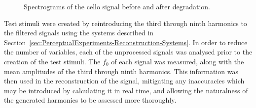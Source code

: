 			\begin{figure}[h!]
				\centering
				\quad
				\caption{Spectrograms of the cello signal before and after degradation.}
				\label{fig:CelloSpectrograms}
			\end{figure}

			Test stimuli were created by reintroducing the third through ninth harmonics to the filtered
			signals using the systems described in
			Section~\ref{sec:PerceptualExperiments-Reconstruction-Systems}. In order to reduce the number of
			variables, each of the unprocessed signals was analysed prior to the creation of the test stimuli.
			The $f_{0}$ of each signal was measured, along with the mean amplitudes of the third through ninth
			harmonics.  This information was then used in the reconstruction of the signal, mitigating any
			inaccuracies which may be introduced by calculating it in real time, and allowing the naturalness
			of the generated harmonics to be assessed more thoroughly.

